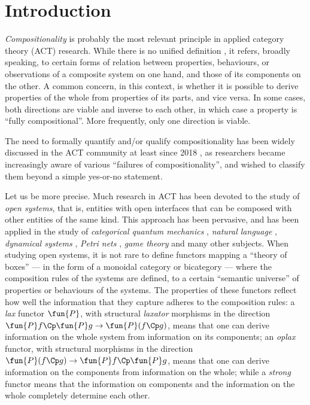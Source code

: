 \section*{Introduction}\label{sec: introduction}
%
%
\emph{Compositionality} is probably the most relevant principle in applied category theory (ACT) research.
While there is no unified definition \cite{Werning_Hinzen_Machery_2012, ghani2018compositional, coecke2021compositionality}, it refers, broadly speaking, to certain forms of relation between properties, behaviours, or observations of a composite system on one hand, and those of its components on the other.
A common concern, in this context, is whether it is possible to derive properties of the whole from properties of its parts, and vice versa.
In some cases, both directions are viable and inverse to each other, in which case a property is ``fully compositional''.
More frequently, only one direction is viable.

The need to formally quantify and/or qualify compositionality has been widely discussed in the ACT community at least since 2018 \cite{Genovese2018mod}, as researchers became increasingly aware of various ``failures of compositionality'', and wished to classify them beyond a simple yes-or-no statement.

Let us be more precise.
Much research in ACT has been devoted to the study of \emph{open systems}, that is, entities with open interfaces that can be composed with other entities of the same kind.
This approach has been pervasive, and has been applied in the study of \emph{categorical quantum mechanics} \cite{abramsky2009categorical}, \emph{natural language} \cite{coecke2021mathematics},  \emph{dynamical systems} \cite{Fong_Spivak_2019}, \emph{Petri nets} \cite{baez2021categories}, \emph{game theory} \cite{ghani2018compositional} and many other subjects.
When studying open systems, it is not rare to define functors mapping a ``theory of boxes''  --- in the form of a monoidal category or bicategory --- where the composition rules of the systems are defined, to a certain ``semantic universe'' of properties or behaviours of the systems.
The properties of these functors reflect how well the information that they capture adheres to the composition rules: a \emph{lax} functor $\fun{P}$, with structural \emph{laxator} morphisms in the direction $\fun{P}f \Cp \fun{P}g \to \fun{P}(f \Cp g)$, means that one can derive information on the whole system from information on its components; an \emph{oplax} functor, with structural morphisms in the direction $\fun{P}(f \Cp g) \to \fun{P}f \Cp \fun{P}g$, means that one can derive information on the components from information on the whole; while a \emph{strong} functor means that the information on components and the information on the whole completely determine each other.

